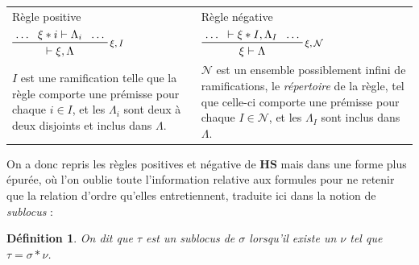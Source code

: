 \documentclass[11pt]{report}
\newcommand{\seq}{\vdash}
\newcommand{\irule}[1]{\footnotesize$#1$}
\newtheorem{definition}{Définition}
\begin{document}
\begin{longtabu}{p{17em}p{17em}}
	\rowfont{\centering\bfseries}
	Règle positive\vspace{3mm} &
	Règle négative\vspace{3mm} \\
	\rowfont{\centering}
	$\prftree[r]{\irule{\xi,I}}
		{\ldots}
		{\xi \ast i \seq \Lambda_i}
		{\ldots}
		{\seq \xi,\Lambda}$ &
	$\prftree[r]{\irule{\xi,\mathcal{N}}}
		{\ldots}
		{\seq \xi \ast I,\Lambda_I}
		{\ldots}
		{\xi \seq \Lambda}$ \\
	\rowfont{\footnotesize}
	$I$ est une ramification telle que la règle comporte une prémisse pour chaque $i \in I$, et les $\Lambda_i$ sont deux à deux disjoints et inclus dans $\Lambda$. &
	$\mathcal{N}$ est un ensemble possiblement infini de ramifications, le \emph{répertoire} de la règle, tel que celle-ci comporte une prémisse pour chaque $I \in \mathcal{N}$, et les $\Lambda_I$ sont inclus dans $\Lambda$.
\end{longtabu}

On a donc repris les règles positives et négative de $\mathbf{HS}$ mais dans une forme plus épurée, où l'on oublie toute l'information relative aux formules pour ne retenir que la relation d'ordre qu'elles entretiennent, traduite ici dans la notion de \emph{sublocus} :
\begin{definition}
	On dit que $\tau$ est un \emph{sublocus} de $\sigma$ lorsqu'il existe un $\nu$ tel que $\tau = \sigma \ast \nu$.
\end{definition}
\end{document}
